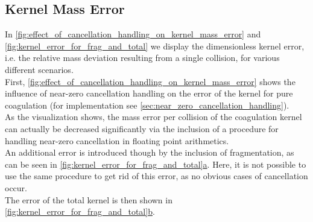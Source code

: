 

    \subsection{Kernel Mass Error}
        In \cref{fig:effect_of_cancellation_handling_on_kernel_mass_error} and
        \cref{fig:kernel_error_for_frag_and_total} we display the dimensionless kernel 
        error, i.e. the relative mass deviation resulting from a single collision,
        for various different scenarios. \\

        First, \cref{fig:effect_of_cancellation_handling_on_kernel_mass_error} shows the
        influence of near-zero cancellation handling on the error of the kernel 
        for pure coagulation
        (for implementation see \cref{sec:near_zero_cancellation_handling}). \\ 

        As the visualization shows, the mass error per collision of the coagulation 
        kernel can actually be decreased significantly via the inclusion of a procedure 
        for handling near-zero cancellation in floating point arithmetics. \\ 

        An additional error is introduced though by the inclusion of fragmentation, 
        as can be seen in \hyperref[fig:kernel_error_for_frag_and_total]
        {\cref*{fig:kernel_error_for_frag_and_total}a}. Here, it is not possible 
        to use the same procedure to get rid of this error, as no obvious cases of
        cancellation occur. \\

        The error of the total kernel is then shown in 
        \hyperref[fig:kernel_error_for_frag_and_total]
        {\cref*{fig:kernel_error_for_frag_and_total}b}. \\

